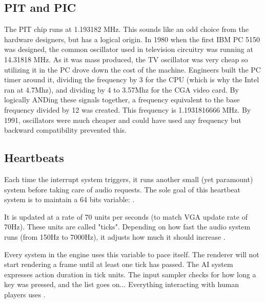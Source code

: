 \subsection{PIT and PIC}
The PIT chip runs at 1.193182 MHz. This sounds like an odd choice from the hardware designers, but has a logical origin. In 1980 when the first IBM PC 5150 was designed, the common oscillator used in television circuitry was running at 14.31818 MHz. As it was mass produced, the TV oscillator was very cheap so utilizing it in the PC drove down the cost of the machine. Engineers built the PC timer around it, dividing the frequency by 3 for the CPU (which is why the Intel ran at 4.7Mhz), and dividing by 4 to 3.57Mhz for the CGA video card. By logically ANDing these signals together, a frequency equivalent to the base frequency divided by 12 was created. This frequency is 1.1931816666 MHz. By 1991, oscillators were much cheaper and could have used any frequency but backward compatibility prevented this.\\
\par














\subsection{Heartbeats}
Each time the interrupt system triggers, it runs another small (yet paramount) system before taking care of audio requests. The sole goal of this heartbeat system is to maintain a 64 bits variable: .\\
\par
\begin{minipage}{\textwidth}

\end{minipage}
\par
It is updated at a rate of 70 units per seconds (to match VGA update rate of 70Hz). These units are called "ticks". Depending on how fast the audio system runs (from 150Hz to 7000Hz), it adjusts how much it should increase .\\
\par
Every system in the engine uses this variable to pace itself. The renderer will not start rendering a frame until at least one tick has passed. The AI system expresses action duration in tick units. The input sampler checks for how long a key was pressed, and the list goes on... Everything interacting with human players uses .\\













